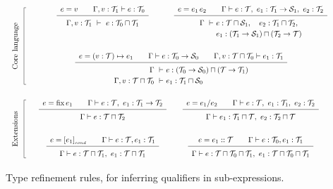 \begin{figure*}
\newcommand\typerule[2]{{\renewcommand\arraystretch{1.5}\begin{array}[t]{c} #1 \\ \hline #2 \end{array}}}
\[
\renewcommand\arraystretch{3}
\begin{array}{cccp{1cm}}
  \multirow{2}{1cm}[-2em]{\begin{tikzpicture}\draw (0,0) -- ++(-1mm,0) -- ++(0,-10.2em) {} node[midway,anchor=base,xshift=-3mm,rotate=90] {Core language} -- ++(1mm,0);\end{tikzpicture}} &
  \typerule{e=v \qquad \Gamma,v:\T_1\vdash e:\T_0}
           {\Gamma,v:\T_1 ~\vdash~ e:\T_0\sqcap\T_1} &
  \typerule{e=e_1\,e_2 \qquad \Gamma \vdash e:\T, ~ e_1:\T_1\to\S_1, ~ e_2:\T_2}
           {\renewcommand\arraystretch{1.2}
            \begin{array}[t]{@{}l@{}l@{}}
              \Gamma ~\vdash~ & e:\T\sqcap\S_1,  \quad
                                e_2:\T_1\sqcap\T_2, \\
                              & e_1:(\T_1\to\S_1)\sqcap(\T_2\to\T)
            \end{array}} & \\
  &
  \cspan2{
  \typerule{e=(v:\T)\mapsto e_1 \qquad \Gamma\vdash e:\T_0\to\S_0 \qquad \Gamma,v:\T\sqcap\T_0\vdash e_1:\T_1}
           {\renewcommand\arraystretch{1.2}
            \begin{array}[t]{r@{}l}
              \Gamma ~\vdash~ & e:(\T_0\to\S_0)\sqcap(\T\to\T_1)\\
              \Gamma,v:\T\sqcap\T_0 ~\vdash~ & e_1:\T_1\sqcap\S_0 
            \end{array}}  } & \\
  \multirow{2}{1cm}[-1.8em]{\begin{tikzpicture}\draw (0,0) -- ++(-1mm,0) -- ++(0,-7.7em) node[midway,anchor=base,xshift=-3mm,rotate=90] {Extensions} -- ++(1mm,0);\end{tikzpicture}} &
  \typerule{e=\fix e_1 \qquad \Gamma\vdash e:\T, ~ e_1:\T_1\to\T_2}          %
           {\Gamma\vdash e: \T\sqcap\T_2} &
  \typerule{e=e_1/e_2 \qquad \Gamma\vdash e:\T, ~ e_1:\T_1, ~ e_2:\T_2}      %
           {\renewcommand\arraystretch{1.2}
            \begin{array}[t]{@{}l@{}l@{}}
              \Gamma\vdash{} & e_1:\T_1\sqcap\T, ~ e_2:\T_2\sqcap\T
            \end{array}} & \\
  &
  \typerule{e=[e_1]_{_{cond}} \qquad \Gamma\vdash e:\T,e_1:\T_1}                           %
           {\Gamma\vdash e:\T\sqcap\T_1, ~ e_1:\T\sqcap\T_1} &
  \typerule{e=e_1::\T \qquad \Gamma\vdash e:\T_0,e_1:\T_1}                           %
           {\Gamma\vdash e:\T\sqcap\T_0\sqcap\T_1, ~ e_1:\T\sqcap\T_0\sqcap\T_1}
\end{array}
\]
\caption{\label{lang:type refinement rules}
  Type refinement rules, for inferring qualifiers in sub-expressions.}
  \vspace{2mm}
\end{figure*}

